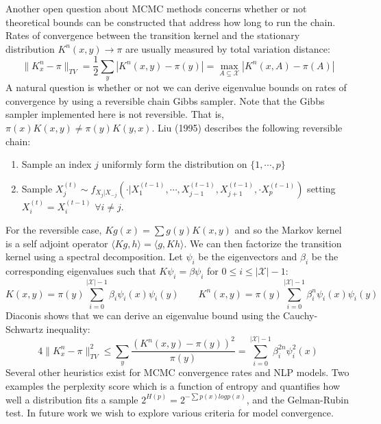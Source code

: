 \documentclass{article}%
\theoremstyle{definition}
\begin{document}
Another open question about MCMC methods concerns whether or not theoretical bounds can be constructed that address how long to run the chain. Rates of convergence between the transition kernel and the stationary distribution $K^n(x,y) \rightarrow \pi$ are usually measured by total variation distance:
\begin{equation}
\|K_x^n - \pi \|_{TV} = \frac{1}{2}\sum_y | K^n(x,y) - \pi(y)| = \max_{A \subseteq \mathcal{X}} |K^n(x,A) - \pi(A) |
\end{equation}
A natural question is whether or not we can derive eigenvalue bounds on rates of convergence by using a reversible chain Gibbs sampler. Note that the Gibbs sampler implemented here is not reversible. That is, $\pi(x)K(x,y) \neq \pi(y)K(y,x)$. Liu (1995) describes the following reversible chain:
\begin{enumerate}
    \item Sample an index $j$ uniformly form the distribution on $\{1, \cdots, p\}$
    \item Sample $X_j^{(t)} \sim f_{X_j |X_{-j}}(\cdot | X_1^{(t-1)},\cdots, X_{j-1}^{(t-1)},  X_{j+1}^{(t-1)}, \cdot  X_{p}^{(t-1)})$ setting $X_i^{(t)}=X_i^{(t-1)}$ $\forall i \neq j$.
\end{enumerate}
For the reversible case, $Kg(x) = \sum g(y)K(x,y)$ and so the Markov kernel is a self adjoint operator $\langle Kg, h\rangle = \langle g, Kh\rangle$. We can then factorize the transition kernel using a spectral decomposition. Let $\psi_i$ be the eigenvectors and $\beta_i$ be the corresponding eigenvalues such that $K\psi_i = \beta\psi_i$ for $0 \leq i \leq |\mathcal{X}|-1$:
\begin{equation}
K(x,y) = \pi(y) \sum\limits_{i=0}^{|\mathcal{X}|-1}\beta_i\psi_i(x)\psi_i(y) \qquad K^n(x,y) = \pi(y) \sum\limits_{i=0}^{|\mathcal{X}|-1}\beta_i^n\psi_i(x)\psi_i(y)
\end{equation}
Diaconis shows that we can derive an eigenvalue bound using the Cauchy-Schwartz inequality:
\begin{equation}
4\|K^n_x - \pi \|^2_{TV} \leq \sum\limits_{y}^{} \frac{(K^n(x,y) - \pi(y))^2}{\pi(y)} = \sum\limits_{i=0}^{|\mathcal{X}|-1}\beta_i^{2n}\psi_i^2(x)
\end{equation}
Several other heuristics exist for MCMC convergence rates and NLP models. Two examples the perplexity score which is a function of entropy and quantifies how well a distribution fits a sample $2^{H(p)} = 2^{-\sum p(x) log p(x)}$, and the Gelman-Rubin test. In future work we wish to explore various criteria for model convergence. 
\end{document}
